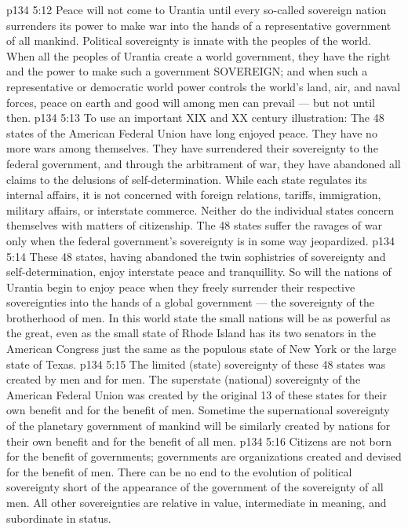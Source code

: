\vs p134 5:12 \pc Peace will not come to Urantia until every so\hyp{}called sovereign nation surrenders its power to make war into the hands of a representative government of all mankind. Political sovereignty is innate with the peoples of the world. When all the peoples of Urantia create a world government, they have the right and the power to make such a government SOVEREIGN; and when such a representative or democratic world power controls the world’s land, air, and naval forces, peace on earth and good will among men can prevail --- but not until then.
\vs p134 5:13 To use an important XIX and XX century illustration: The 48 states of the American Federal Union have long enjoyed peace. They have no more wars among themselves. They have surrendered their sovereignty to the federal government, and through the arbitrament of war, they have abandoned all claims to the delusions of self\hyp{}determination. While each state regulates its internal affairs, it is not concerned with foreign relations, tariffs, immigration, military affairs, or interstate commerce. Neither do the individual states concern themselves with matters of citizenship. The 48 states suffer the ravages of war only when the federal government’s sovereignty is in some way jeopardized.
\vs p134 5:14 \pc These 48 states, having abandoned the twin sophistries of sovereignty and self\hyp{}determination, enjoy interstate peace and tranquillity. So will the nations of Urantia begin to enjoy peace when they freely surrender their respective sovereignties into the hands of a global government --- the sovereignty of the brotherhood of men. In this world state the small nations will be as powerful as the great, even as the small state of Rhode Island has its two senators in the American Congress just the same as the populous state of New York or the large state of Texas.
\vs p134 5:15 The limited (state) sovereignty of these 48 states was created by men and for men. The superstate (national) sovereignty of the American Federal Union was created by the original 13 of these states for their own benefit and for the benefit of men. Sometime the supernational sovereignty of the planetary government of mankind will be similarly created by nations for their own benefit and for the benefit of all men.
\vs p134 5:16 Citizens are not born for the benefit of governments; governments are organizations created and devised for the benefit of men. There can be no end to the evolution of political sovereignty short of the appearance of the government of the sovereignty of all men. All other sovereignties are relative in value, intermediate in meaning, and subordinate in status.

